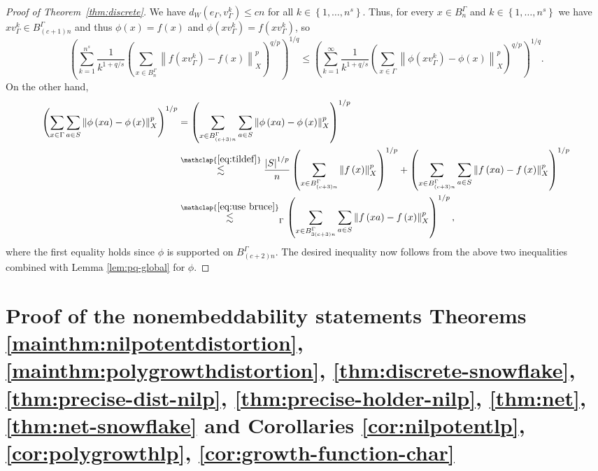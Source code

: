 \documentclass[11pt,reqno]{amsart}
\newcommand{\1}{\mathbf 1}
\begin{document}
\begin{proof}[Proof of Theorem~\ref{thm:discrete}]
We have $d_W\left(e_\Gamma,v_\Gamma^k\right)\le cn$ for all $k\in \left\{1,\ldots, n^s\right\}$. Thus, for every $x\in B^\Gamma_n$ and $k\in \left\{1,\ldots, n^s\right\}$ we have $xv_\Gamma^k\in B^\Gamma_{\left(c+1\right)n}$ and thus $\phi\left(x\right)=f\left(x\right)$ and $\phi\left(xv_\Gamma^k\right)=f\left(xv_\Gamma^k\right)$, so
\begin{equation}\label{eq:pass to phi}
\left(\sum_{k=1}^{n^s}\frac{1}{k^{1+q/s}}\left(\sum_{x\in B^\Gamma_n}\left\|f\left(xv_\Gamma^k\right)-f\left(x\right)\right\|_X^p\right)^{q/p}\right)^{1/q}\le  \left(\sum_{k=1}^{\infty}\frac{1}{k^{1+q/s}}\left(\sum_{x\in \Gamma} \left\|\phi\left(xv_\Gamma^k\right)-\phi\left(x\right)\right\|_X^p\right)^{q/p}\right)^{1/q}.
\end{equation}
On the other hand,
\begin{align*}
\left(\sum_{x\in \Gamma} \sum_{a\in S}\left\|\phi\left(xa\right)-\phi\left(x\right)\right\|^p_X\right)^{1/p}&= \left(\sum_{x\in B^\Gamma_{\left(c+3\right)n}} \sum_{a\in S}\left\|\phi\left(xa\right)-\phi\left(x\right)\right\|^p_X\right)^{1/p}\\
&\stackrel{\mathclap{\eqref{eq:tildef}}}{\lesssim} \frac{\left|S\right|^{1/p}}{n}\left(\sum_{x\in B^\Gamma_{\left(c+3\right)n}} \left\|f\left(x\right)\right\|_X^p\right)^{1/p}+\left(\sum_{x\in B^\Gamma_{\left(c+3\right)n}} \sum_{a\in S}\left\|f\left(xa\right)-f\left(x\right)\right\|^p_X\right)^{1/p}\\
&\stackrel{\mathclap{\eqref{eq:use bruce}}}{\lesssim}_\Gamma \label{eq:use 21}\left(\sum_{x\in B^\Gamma_{3\left(c+3\right)n}} \sum_{a\in S}\left\|f\left(xa\right)-f\left(x\right)\right\|^p_X\right)^{1/p},
\end{align*}
where the first equality holds since $\phi$ is supported on $B^\Gamma_{\left(c+2\right)n}$. The desired inequality now follows from the above two inequalities combined with Lemma \ref{lem:pq-global} for $\phi$.
\end{proof}



\section{Proof of the nonembeddability statements Theorems \ref{mainthm:nilpotentdistortion}, \ref{mainthm:polygrowthdistortion}, \ref{thm:discrete-snowflake}, \ref{thm:precise-dist-nilp}, \ref{thm:precise-holder-nilp}, \ref{thm:net}, \ref{thm:net-snowflake} 
 and Corollaries \ref{cor:nilpotentlp}, \ref{cor:polygrowthlp}, \ref{cor:growth-function-char}}\label{sec:net}
 
\end{document}
